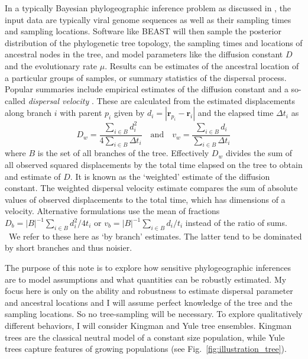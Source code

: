 \documentclass[aps,rmp, twocolumn]{revtex4}
\newcommand{\rvec}{\mathbf{r}}
\begin{document}
In a typically Bayesian phylogeographic inference problem as discussed in \citet{pybus_unifying_2012}, the input data are typically viral genome sequences as well as their sampling times and sampling locations.
Software like BEAST will then sample the posterior distribution of the phylogenetic tree topology, the sampling times and locations of ancestral nodes in the tree, and model parameters like the diffusion constant $D$ and the evolutionary rate $\mu$.
Results can be estimates of the ancestral location of a particular groups of samples, or summary statistics of the dispersal process.
Popular summaries include empirical estimates of the diffusion constant  \citep{pybus_unifying_2012} and a so-called \emph{dispersal velocity} \citep{dellicour_using_2017}. These are calculated from the estimated displacements along branch $i$ with parent $p_i$ given by $d_i = |\rvec_{p_i} - \rvec_{i}|$ and the elapsed time $\Delta t_i$ as
\begin{equation}
    \label{eq:disperal_parameters}
    D_w = \frac{\sum_{i\in B}d_i^2}{4\sum_{i\in B} \Delta t_i} \quad \mathrm{and}  \quad v_w = \frac{\sum_{i\in B} d_i}{\sum_{i\in B} \Delta t_i}
\end{equation}
where $B$ is the set of all branches of the tree.
Effectively $D_w$ divides the sum of all observed squared displacements by the total time elapsed on the tree to obtain and estimate of $D$.
It is known as the `weighted' estimate of the diffusion constant.
The weighted dispersal velocity estimate compares the sum of absolute values of observed displacements to the total time, which has dimensions of a velocity.
Alternative formulations use the mean of fractions $D_b = |B|^{-1} \sum_{i\in B}d_i^2/4t_i$ or $v_b = |B|^{-1} \sum_{i\in B}d_i/t_i$ instead of the ratio of sums. \
We refer to these here as `by branch' estimates.
The latter tend to be dominated by short branches and thus noisier.


The purpose of this note is to explore how sensitive phylogeographic inferences are to model assumptions and what quantities can be robustly estimated.
My focus here is only on the ability and robustness to estimate dispersal parameter and ancestral locations and I will assume perfect knowledge of the tree and the sampling locations.
So no tree-sampling will be necessary.
To explore qualitatively different behaviors, I will consider Kingman and Yule tree ensembles. Kingman trees are the classical neutral model of a constant size population, while Yule trees capture features of growing populations (see Fig.~\ref{fig:illustration_tree}).
\end{document}
